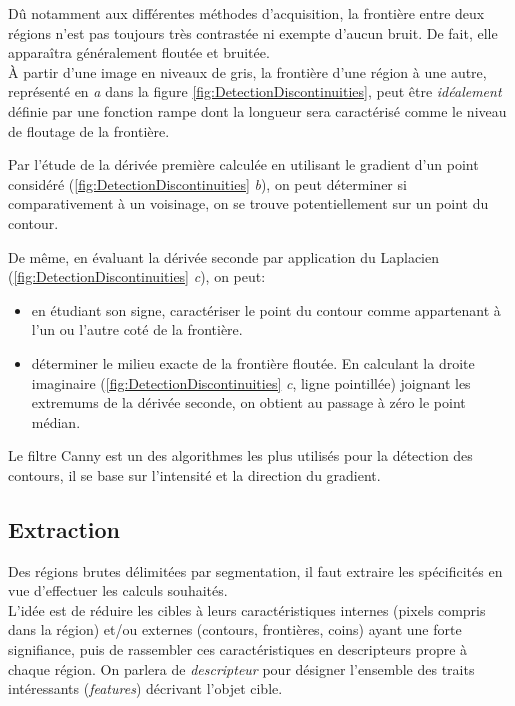 \documentclass[a4paper,12pt]{report}
\begin{document}
Dû notamment aux différentes méthodes d'acquisition, la frontière entre deux régions n'est pas toujours très contrastée ni exempte d'aucun bruit. De fait, elle apparaîtra généralement floutée et bruitée.\\ 
\`A partir d'une image en niveaux de gris, la frontière d'une région à une autre, représenté en \textit{a} dans la figure \ref{fig:DetectionDiscontinuities}, peut être \textit{idéalement} définie par une fonction rampe dont la longueur sera caractérisé comme le niveau de floutage de la frontière. 

Par l'étude de la dérivée première calculée en utilisant le gradient d'un point considéré (\ref{fig:DetectionDiscontinuities} \textit{b}), on peut déterminer si comparativement à un voisinage, on se trouve potentiellement sur un point du contour. 

De même, en évaluant la dérivée seconde par application du Laplacien (\ref{fig:DetectionDiscontinuities} \textit{c}), on peut:\begin{itemize}
\item en étudiant son signe, caractériser le point du contour comme appartenant à l'un ou l'autre coté de la frontière.
\item déterminer le milieu exacte de la frontière floutée. En calculant la droite imaginaire (\ref{fig:DetectionDiscontinuities} \textit{c}, ligne pointillée) joignant les extremums de la dérivée seconde, on obtient au passage à zéro le point médian.\\
\end{itemize}

Le filtre Canny est un des algorithmes les plus utilisés pour la détection des contours, il se base sur l'intensité et la direction du gradient. 

\subsection{Extraction}

Des régions brutes délimitées par segmentation, il faut extraire les spécificités en vue d'effectuer les calculs souhaités.\\

L'idée est de réduire les cibles à leurs caractéristiques internes (pixels compris dans la région) et/ou externes (contours, frontières, coins) ayant une forte signifiance, puis de rassembler ces caractéristiques en descripteurs propre à chaque région. On parlera de \textit{descripteur} pour désigner l'ensemble des traits intéressants (\textit{features}) décrivant l'objet cible. 
\end{document}
